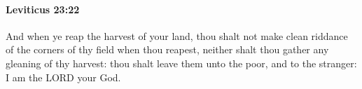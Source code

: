 
		\paragraph{Leviticus 23:22} %
			\label{LEVITICUS-23-22}

			And when ye reap the harvest of your land, thou shalt not make clean riddance of the corners of thy field when thou reapest, neither shalt thou gather any gleaning of thy harvest: thou shalt leave them unto the poor, and to the stranger: I am the LORD your God.


